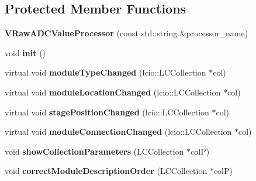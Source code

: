 \subsection*{Protected Member Functions}
\begin{DoxyCompactItemize}
\item 
{\bfseries V\-Raw\-A\-D\-C\-Value\-Processor} (const std\-::string \&processor\-\_\-name)\label{classCALICE_1_1VRawADCValueProcessor_aaf1fa3484d50b2a28f96f3ec3853e9cc}

\item 
void {\bfseries init} ()\label{classCALICE_1_1VRawADCValueProcessor_a68246236e2ed3c612b9617234655d2a1}

\item 
virtual void {\bfseries module\-Type\-Changed} (lcio\-::\-L\-C\-Collection $\ast$col)\label{classCALICE_1_1VRawADCValueProcessor_a40c7f7d113fff799c0334c7b773b5513}

\item 
virtual void {\bfseries module\-Location\-Changed} (lcio\-::\-L\-C\-Collection $\ast$col)\label{classCALICE_1_1VRawADCValueProcessor_a11391eed95cf78c653dca943c1444134}

\item 
virtual void {\bfseries stage\-Position\-Changed} (lcio\-::\-L\-C\-Collection $\ast$col)\label{classCALICE_1_1VRawADCValueProcessor_ac1206e19dae92b34ee26dcbee542c3ab}

\item 
virtual void {\bfseries module\-Connection\-Changed} (lcio\-::\-L\-C\-Collection $\ast$col)\label{classCALICE_1_1VRawADCValueProcessor_af79356a56727b21864897f799b2e98ed}

\item 
void {\bfseries show\-Collection\-Parameters} (L\-C\-Collection $\ast$col\-P)\label{classCALICE_1_1VRawADCValueProcessor_a5cd308af8668b39a2dc93eafc1fba03c}

\item 
void {\bfseries correct\-Module\-Description\-Order} (L\-C\-Collection $\ast$col\-P)\label{classCALICE_1_1VRawADCValueProcessor_a3f3ae1c5de99f40e5682aa35200d0365}

\end{DoxyCompactItemize}

